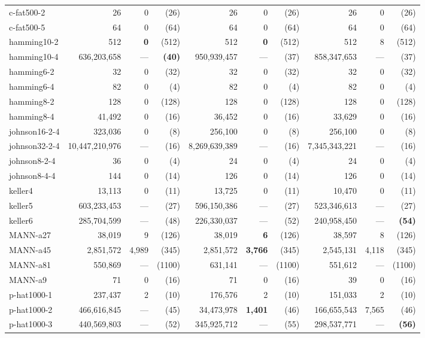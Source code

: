 \documentclass{l4proj}
\begin{document}
\begin{table}
\begin{center}
\begin{scriptsize}
\begin{tabular}{|l|r r r|r r r|r r r|}
c-fat500-2 & 26 & 0 & (26) & 26 & 0 & (26) & 26 & 0 & (26) \\ 
c-fat500-5 & 64 & 0 & (64) & 64 & 0 & (64) & 64 & 0 & (64) \\ 
hamming10-2 & 512 & \bf{0} & (512) & 512 & \bf{0} & (512) & 512 & 8 & (512) \\ 
hamming10-4 & 636,203,658 & --- & \bf{(40)} & 950,939,457 & --- & (37) & 858,347,653 & --- & (37) \\ 
hamming6-2 & 32 & 0 & (32) & 32 & 0 & (32) & 32 & 0 & (32) \\ 
hamming6-4 & 82 & 0 & (4) & 82 & 0 & (4) & 82 & 0 & (4) \\ 
hamming8-2 & 128 & 0 & (128) & 128 & 0 & (128) & 128 & 0 & (128) \\ 
hamming8-4 & 41,492 & 0 & (16) & 36,452 & 0 & (16) & 33,629 & 0 & (16) \\ 
johnson16-2-4 & 323,036 & 0 & (8) & 256,100 & 0 & (8) & 256,100 & 0 & (8) \\ 
johnson32-2-4 & 10,447,210,976 & --- & (16) & 8,269,639,389 & --- & (16) & 7,345,343,221 & --- & (16) \\ 
johnson8-2-4 & 36 & 0 & (4) & 24 & 0 & (4) & 24 & 0 & (4) \\ 
johnson8-4-4 & 144 & 0 & (14) & 126 & 0 & (14) & 126 & 0 & (14) \\ 
keller4 & 13,113 & 0 & (11) & 13,725 & 0 & (11) & 10,470 & 0 & (11) \\ 
keller5 & 603,233,453 & --- & (27) & 596,150,386 & --- & (27) & 523,346,613 & --- & (27) \\ 
keller6 & 285,704,599 & --- & (48) & 226,330,037 & --- & (52) & 240,958,450 & --- & \bf{(54)} \\ 
MANN-a27 & 38,019 & 9 & (126) & 38,019 & \bf{6} & (126) & 38,597 & 8 & (126) \\ 
MANN-a45 & 2,851,572 & 4,989 & (345) & 2,851,572 & \bf{3,766} & (345) & 2,545,131 & 4,118 & (345) \\ 
MANN-a81 & 550,869 & --- & (1100) & 631,141 & --- & (1100) & 551,612 & --- & (1100) \\ 
MANN-a9 & 71 & 0 & (16) & 71 & 0 & (16) & 39 & 0 & (16) \\ 
p-hat1000-1 & 237,437 & 2 & (10) & 176,576 & 2 & (10) & 151,033 & 2 & (10) \\ 
p-hat1000-2 & 466,616,845 & --- & (45) & 34,473,978 & \bf{1,401} & (46) & 166,655,543 & 7,565 & (46) \\ 
p-hat1000-3 & 440,569,803 & --- & (52) & 345,925,712 & --- & (55) & 298,537,771 & --- & \bf{(56)} \\ 

\end{tabular}
\end{scriptsize}
\end{center}
\end{table}
\end{document}
